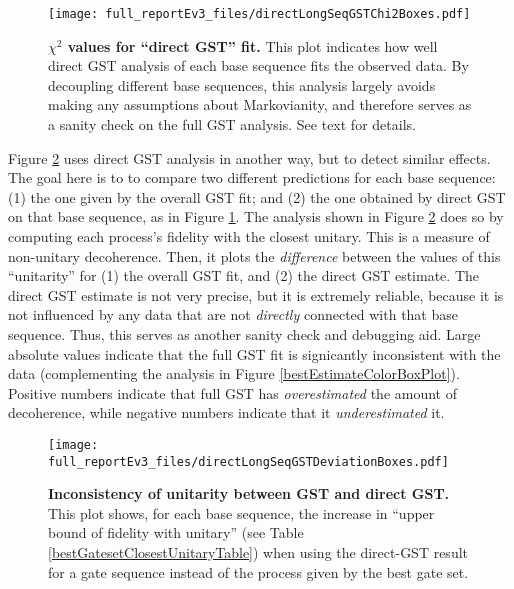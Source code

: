 {\begin{figure}
\begin{center}
\texttt{[image: full\_reportEv3\_files/directLongSeqGSTChi2Boxes.pdf]}
\caption{\textbf{$\chi^2$ values for ``direct GST'' fit.}  This plot indicates how well direct GST analysis of each base sequence fits the observed data.  By decoupling different base sequences, this analysis largely avoids making any assumptions about Markovianity, and therefore serves as a sanity check on the full GST analysis.  See text for details.\label{directLSGSTChi2BoxPlot}}
\end{center}
\end{figure}

Figure \ref{directLSGSTDeviationBoxPlot} uses direct GST analysis in another way, but to detect similar effects.   The goal here is to to compare two different predictions for each base sequence:  (1) the one given by the overall GST fit; and (2) the one obtained by direct GST on that base sequence, as in Figure \ref{directLSGSTChi2BoxPlot}.  The analysis shown in Figure \ref{directLSGSTDeviationBoxPlot} does so by computing each process's fidelity with the closest unitary.  This is a measure of non-unitary decoherence.  Then, it plots the \emph{difference} between the values of this ``unitarity'' for (1) the overall GST fit, and (2) the direct GST estimate.  The direct GST estimate is not very precise, but it is extremely reliable, because it is not influenced by any data that are not \emph{directly} connected with that base sequence.  Thus, this serves as another sanity check and debugging aid.  Large absolute values indicate that the full GST fit is signicantly inconsistent with the data (complementing the analysis in Figure \ref{bestEstimateColorBoxPlot}).  Positive numbers indicate that full GST has \emph{overestimated} the amount of decoherence, while negative numbers indicate that it \emph{underestimated} it.

\begin{figure}
\begin{center}
\texttt{[image: full\_reportEv3\_files/directLongSeqGSTDeviationBoxes.pdf]}
\caption{\textbf{Inconsistency of unitarity between GST and direct GST.}  This plot shows, for each base sequence, the increase in ``upper bound of fidelity with unitary'' (see Table \ref{bestGatesetClosestUnitaryTable}) when using the direct-GST result for a gate sequence instead of the process given by the best gate set.\label{directLSGSTDeviationBoxPlot}}
\end{center}
\end{figure}

}
